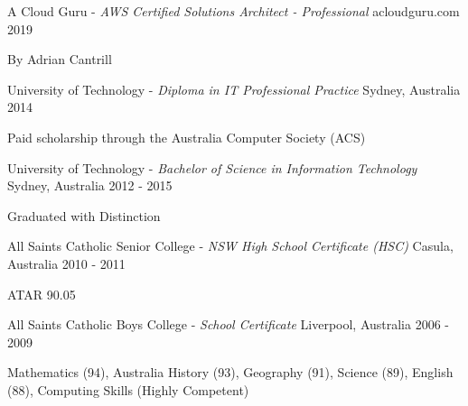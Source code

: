 

\begin{cventries}

  \cventry
  {} %
  {A Cloud Guru - \emph{AWS Certified Solutions Architect - Professional}} %
  {acloudguru.com} %
  {2019} %
  {
    \begin{cvitems} %
      \item {By Adrian Cantrill}
    \end{cvitems}
  }

  \cventry
  {} %
  {University of Technology - \emph{Diploma in IT Professional Practice}} %
  {Sydney, Australia} %
  {2014} %
  {
    \begin{cvitems} %
      \item {Paid scholarship through the Australia Computer Society (ACS)}
    \end{cvitems}
  }

  \cventry
  {} %
  {University of Technology - \emph{Bachelor of Science in Information Technology}} %
  {Sydney, Australia} %
  {2012 - 2015} %
  {
    \begin{cvitems} %
      \item {Graduated with Distinction}
    \end{cvitems}
  }

  \cventry
  {} %
  {All Saints Catholic Senior College - \emph{NSW High School Certificate (HSC)}} %
  {Casula, Australia} %
  {2010 - 2011} %
  {
    \begin{cvitems} %
      \item {ATAR 90.05}
    \end{cvitems}
  }

  \cventry
  {} %
  {All Saints Catholic Boys College - \emph{School Certificate}} %
  {Liverpool, Australia} %
  {2006 - 2009} %
  {
    \begin{cvitems} %
      \item {Mathematics (94), Australia History (93), Geography (91), Science (89), English (88), Computing Skills (Highly Competent)}
    \end{cvitems}
  }


\end{cventries}
